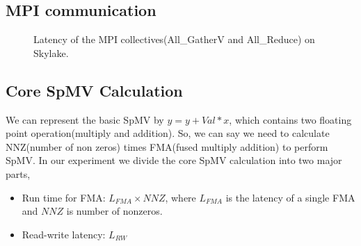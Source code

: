 \documentclass[conference, 10ppt]{IEEEtran}
\begin{document}
\subsection{MPI communication}
\begin{figure}[hbt!]
	\centering
	\caption{Latency of the MPI collectives(All\_GatherV and All\_Reduce) on Skylake.}
	\label{fig:osu-collectives}
\end{figure}


\subsection{Core SpMV Calculation}
We can represent the basic SpMV by $y=y+Val*x$, which contains two floating point operation(multiply and addition). 
So, we can say we need to calculate NNZ(number of non zeros) times FMA(fused multiply addition) to perform SpMV.
In our experiment we divide the core SpMV calculation into two major parts,
\begin{itemize}
\item Run time for FMA: $L_{FMA}\times NNZ$, where $L_{FMA}$ is the latency of a single FMA and $NNZ$ is number of nonzeros.
\item Read-write latency: $L_{RW}$
\end{itemize} 
\end{document}
